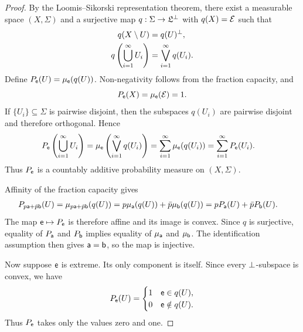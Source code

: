 \begin{mathSection}
\begin{proof}
	By the Loomis--Sikorski representation theorem, there exist a measurable space $(X,\Sigma)$ and a surjective map $q:\Sigma \to \mathfrak{L}^{\ortho}$ with $q(X)=\Ens$ such that
	\begin{equation}
		\begin{aligned}
			q(X \setminus U) &= q(U)^{\ortho}, \\
			q\left(\bigcup_{i=1}^{\infty} U_i\right)
			&= \bigvee_{i=1}^{\infty} q(U_i).
		\end{aligned}
	\end{equation}
	Define $P_{\ens}(U)=\mu_{\ens}(q(U))$. Non-negativity follows from the fraction capacity, and
	\begin{equation}
		P_{\ens}(X)=\mu_{\ens}(\Ens)=1.
	\end{equation}
	If $\{U_i\} \subseteq \Sigma$ is pairwise disjoint, then the subspaces $q(U_i)$ are pairwise disjoint and therefore orthogonal. Hence
	\begin{equation}
		\begin{aligned}
			P_{\ens}\left(\bigcup_{i=1}^{\infty} U_i\right)
			&= \mu_{\ens}\left(\bigvee_{i=1}^{\infty} q(U_i)\right) = \sum_{i=1}^{\infty}\mu_{\ens}(q(U_i))
			= \sum_{i=1}^{\infty}P_{\ens}(U_i).
		\end{aligned}
	\end{equation}
	Thus $P_{\ens}$ is a countably additive probability measure on $(X,\Sigma)$.
	
	Affinity of the fraction capacity gives
	\begin{equation}
		\begin{aligned}
			P_{p\ens[a]+\bar{p}\ens[b]}(U)
			&= \mu_{p\ens[a]+\bar{p}\ens[b]}(q(U)) = p\mu_{\ens[a]}(q(U))+\bar{p}\mu_{\ens[b]}(q(U)) = pP_{\ens[a]}(U)+\bar{p}P_{\ens[b]}(U).
		\end{aligned}
	\end{equation}
	The map $\ens \mapsto P_{\ens}$ is therefore affine and its image is convex. Since $q$ is surjective, equality of $P_{\ens[a]}$ and $P_{\ens[b]}$ implies equality of $\mu_{\ens[a]}$ and $\mu_{\ens[b]}$. The identification assumption then gives $\ens[a]=\ens[b]$, so the map is injective.
	
	Now suppose $\ens$ is extreme. Its only component is itself. Since every $\ortho$-subspace is convex, we have
	\begin{equation}
		P_{\ens}(U)
		= \begin{cases}
			1 & \ens \in q(U), \\
			0 & \ens \notin q(U).
		\end{cases}
	\end{equation}
	Thus $P_{\ens}$ takes only the values zero and one.
	

\end{proof}
\end{mathSection}
